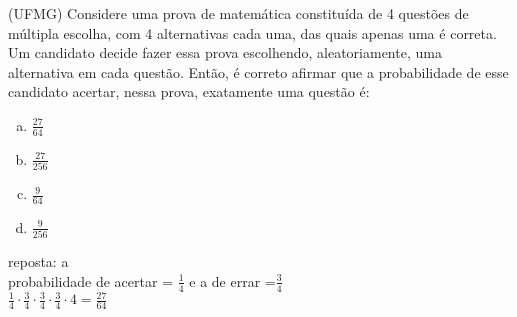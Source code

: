 \begin{ex}
 	(UFMG) Considere uma prova de matemática constituída de 4 questões de múltipla escolha, com 4 alternativas cada uma, das quais apenas uma é correta.	Um candidato decide fazer essa prova escolhendo, aleatoriamente, uma alternativa em cada questão.
Então, é correto afirmar que a probabilidade de esse candidato acertar, nessa prova, exatamente uma questão é:
    \begin{enumerate}[(a)]
    \item $\frac{27}{64}$
    \item $\frac{27}{256}$
    \item $\frac{9}{64}$
    \item $\frac{9}{256}$
    \end{enumerate}
      \begin{sol}
       reposta: a \\
       probabilidade de acertar = $\frac{1}{4}$ e a de errar =$\frac{3}{4}$ \\
       $\frac{1}{4}\cdot\frac{3}{4}\cdot\frac{3}{4}\cdot\frac{3}{4}\cdot4=\frac{27}{64}$
      \end{sol}
\end{ex}